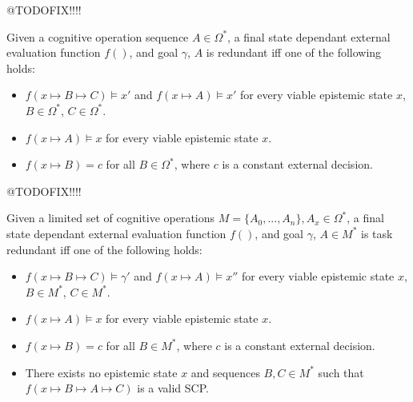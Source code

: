 \begin{comment}

\end{comment}
@TODOFIX!!!!
\begin{lemma} \label{lem:uniredundant}
Given a cognitive operation sequence $A \in \Omega^*$, a final state dependant external evaluation function $f()$, and goal $\gamma$, $A$ is redundant iff one of the following holds:
\begin{itemize}
\item $f(x \longmapsto B \longmapsto C) \models x'$ and $f(x \longmapsto A) \models x'$ for every viable epistemic state $x$, $B \in \Omega^*$, $C \in \Omega^*$. 
\item $f(x \longmapsto A) \models x$ for every viable epistemic state $x$.
\item $f(x \longmapsto B)=c$ for all $B \in \Omega^*$, where $c$ is a constant external decision.
\end{itemize}
\end{lemma}



@TODOFIX!!!!
\begin{lemma} \label{lem:taskredundant}
Given a limited set of cognitive operations $M=\{A_0, ..., A_n\}, A_x \in \Omega^*$, a final state dependant external evaluation function  $f()$, and goal $\gamma$, $A \in M^*$ is task redundant iff one of the following holds:
\begin{itemize}
\item $f(x \longmapsto B \longmapsto C) \models \gamma'$ and $f(x \longmapsto A) \models x''$ for every viable epistemic state $x$, $B \in M^*$, $C \in M^*$. 
\item $f(x \longmapsto A) \models x$ for every viable epistemic state $x$.
\item $f(x \longmapsto B)=c$ for all $B \in M^*$, where $c$ is a constant external decision.
\item There exists no epistemic state $x$ and sequences $B, C \in M^*$ such that $f(x \longmapsto B \longmapsto A \longmapsto C)$ is a valid SCP.
\end{itemize}
\end{lemma}




